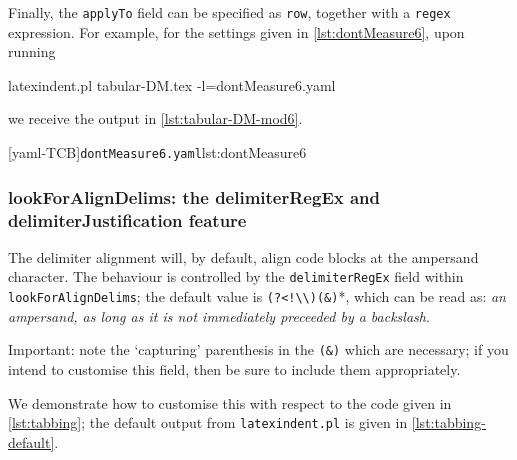 	Finally, the \texttt{applyTo} field can be specified as \texttt{row}, together with a
	\texttt{regex} expression. For example, for the settings given in
	\cref{lst:dontMeasure6}, upon running
	\begin{commandshell} 
latexindent.pl tabular-DM.tex -l=dontMeasure6.yaml
\end{commandshell}
	we receive the output in \cref{lst:tabular-DM-mod6}.

	\begin{cmhtcbraster}
		[yaml-TCB]{\texttt{dontMeasure6.yaml}}{lst:dontMeasure6}
	\end{cmhtcbraster}

\subsubsection{lookForAlignDelims: the delimiterRegEx and delimiterJustification feature}\label{sec:delimiter-reg-ex}

	The delimiter alignment%
	 will, by default, align code blocks at the
	ampersand character. The behaviour is controlled by the \texttt{delimiterRegEx} field
	within \texttt{lookForAlignDelims}; the default value is
	\lstinline*'(?<!\\)(&)'*, which can be read as: \emph{an ampersand, as long as it is not
		immediately preceeded by a backslash}.

	\begin{warning}
		Important: note the `capturing' parenthesis in the \lstinline!(&)! which are necessary;
		if you intend to customise this field, then be sure to include them appropriately.
	\end{warning}

	We demonstrate how to customise this with respect to the code given in
	\cref{lst:tabbing}; the default output from \lstinline!latexindent.pl! is given in
	\cref{lst:tabbing-default}.

